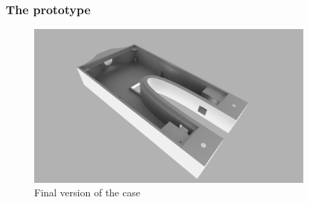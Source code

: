 \subsubsection{The prototype}

\begin{figure}[H]
\begin{center}
	\includegraphics[width = 10cm]{Figures/Case_rev_4.png}
	\caption{Final version of the case}
	\label{Case_rev_4}
\end{center}
\end{figure}
